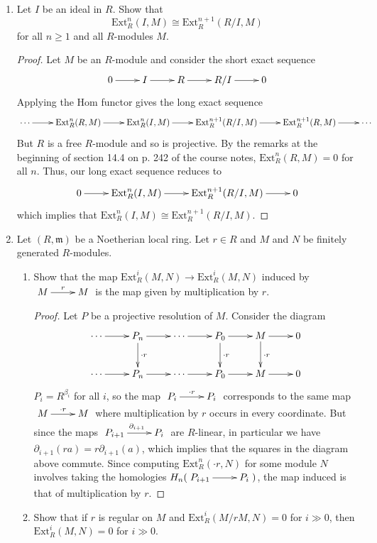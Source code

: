 \documentclass[11pt,oneside,english]{amsart}
\theoremstyle{definition}
\newcommand{\MF}[1]{\mathfrak{#1}}
\newcommand{\Ext}{\text{Ext}}
\begin{document}
\begin{enumerate}[leftmargin=*]
\pagebreak

\item Let $I$ be an ideal in $R$. Show that
\[
\Ext^{n}_R(I,M) \cong \Ext^{n+1}_R(R/I,M)
\]
for all $n \geqslant 1$ and all $R$-modules $M$.

\begin{proof}
Let $M$ be an $R$-module and consider the short exact sequence
\[
\xymatrix{0 \ar[r] & I \ar[r] & R \ar[r] & R/I \ar[r] &0}
\]
Applying the Hom functor gives the long exact sequence
\[
\xymatrix{\cdots \ar[r] & \Ext_R^n(R,M) \ar[r] & \Ext_R^n(I,M) \ar[r] & \Ext_R^{n+1}(R/I,M) \ar[r] & \Ext_R^{n+1}(R,M) \ar[r] & \cdots}
\]
But $R$ is a free $R$-module and so is projective. By the remarks at the beginning of section 14.4 on p. 242 of the course notes, $\Ext_R^{n}(R,M)=0$ for all $n$. Thus, our long exact sequence reduces to
\[
\xymatrix{0 \ar[r] & \Ext_R^n(I,M) \ar[r] & \Ext_R^{n+1}(R/I,M) \ar[r] & 0}
\]
which implies that $\Ext_R^n(I,M)\cong \Ext_R^{n+1}(R/I,M)$.
\end{proof}

\item Let $(R,\MF{m})$ be a Noetherian local ring. Let $r \in R$ and $M$ and $N$ be finitely generated $R$-modules.
\begin{enumerate}
\item Show that the map $\Ext^i_R(M,N) \to \Ext^i_R(M,N)$ induced by $\xymatrix{M \ar[r]^-r & M}$ is the map given by multiplication by $r$.

\begin{proof}
Let $P$ be a projective resolution of $M$. Consider the diagram
\[
\xymatrix{\cdots \ar[r] & P_n \ar[r]\ar[d]^{\cdot r} & \cdots \ar[r] & P_0 \ar[r]\ar[d]^{\cdot r} & M \ar[r] \ar[d]^{\cdot r} &0\\
\cdots \ar[r] & P_n \ar[r] & \cdots \ar[r] & P_0 \ar[r] & M \ar[r] &0}
\]
$P_i=R^{\beta_i}$ for all $i$, so the map $\xymatrix{P_i \ar[r]^{\cdot r} & P_i}$ corresponds to the same map $\xymatrix{M \ar[r]^{\cdot r} & M}$ where multiplication by $r$ occurs in every coordinate. But since the maps $\xymatrix{P_{i+1} \ar[r]^{\partial_{i+1}} & P_i}$ are $R$-linear, in particular we have $\partial_{i+1}(ra)=r\partial_{i+1}(a)$, which implies that the squares in the diagram above commute. Since computing $\Ext_R^n(\cdot r, N)$ for some module $N$ involves taking the homologies $H_n(\xymatrix{P_{i+1} \ar[r] & P_i})$, the map induced is that of multiplication by $r$.
\end{proof}

\item Show that if $r$ is regular on $M$ and $\Ext^i_R(M/rM,N) = 0$ for $i \gg 0$, then $\Ext^i_R(M,N) = 0$ for $i \gg 0$.


\end{enumerate}
\end{enumerate}
\end{document}
